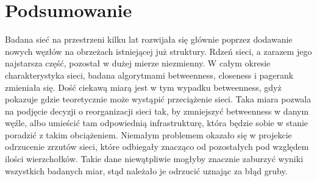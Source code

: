 \chapter{Podsumowanie}
Badana sieć na przestrzeni kilku lat rozwijała się głównie poprzez dodawanie nowych węzłów na obrzeżach istniejącej już struktury. Rdzeń sieci, a zarazem jego najstarsza część, pozostał w dużej mierze niezmienny. W całym okresie charakterystyka sieci, badana algorytmami betweenness, closeness i pagerank zmieniała się. Dość ciekawą miarą jest w tym wypadku betweenness, gdyż pokazuje gdzie teoretycznie może wystąpić przeciążenie sieci. Taka miara pozwala na podjęcie decyzji o reorganizacji sieci tak, by zmniejszyć betweenness w danym węźle, albo umieścić tam odpowiednią infrastrukturę, która będzie sobie w stanie poradzić z takim obciążeniem. Niemałym problemem okazało się w projekcie odrzucenie zrzutów sieci, które odbiegały znacząco od pozostałych pod względem ilości wierzchołków. Takie dane niewątpliwie mogłyby znacznie zaburzyć wyniki wszystkich badanych miar, stąd należało je odrzucić uznając za błąd gruby. 